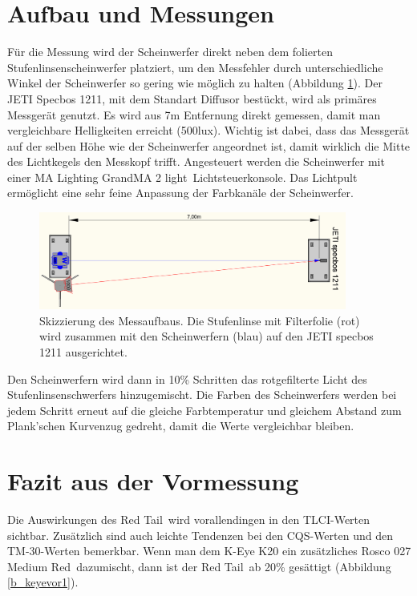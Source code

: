 \section{Aufbau und Messungen}
\label{sec_vmaum}

Für die Messung wird der Scheinwerfer direkt neben dem folierten Stufenlinsenscheinwerfer platziert, um den Messfehler durch unterschiedliche Winkel der Scheinwerfer so gering wie möglich zu halten (Abbildung \ref{b_aufbaumessung1}). Der JETI Specbos 1211, mit dem Standart Diffusor bestückt, wird als primäres Messgerät genutzt. Es wird aus 7m Entfernung direkt gemessen, damit man vergleichbare Helligkeiten erreicht (500lux). Wichtig ist dabei, dass das Messgerät auf der selben Höhe wie der Scheinwerfer angeordnet ist, damit wirklich die Mitte des Lichtkegels den Messkopf trifft.
Angesteuert werden die Scheinwerfer mit einer MA Lighting \glqq GrandMA 2 light\grqq\ Lichtsteuerkonsole. Das Lichtpult ermöglicht eine sehr feine Anpassung der Farbkanäle der Scheinwerfer.

\begin{figure}[H]     %
\centering
\includegraphics[width=0.9\textwidth]{bilder/aufbaumessung1} 
\caption {Skizzierung des Messaufbaus. Die Stufenlinse mit Filterfolie (rot) wird zusammen mit den Scheinwerfern (blau) auf den JETI specbos 1211 ausgerichtet.}\label{b_aufbaumessung1}
\end{figure}



Den Scheinwerfern wird dann in 10\% Schritten das rotgefilterte Licht des Stufenlinsenschwerfers hinzugemischt. Die Farben des Scheinwerfers werden bei jedem Schritt erneut auf die gleiche Farbtemperatur und gleichem Abstand zum Plank'schen Kurvenzug gedreht, damit die Werte vergleichbar bleiben.


\section{Fazit aus der Vormessung}
\label{sec_vmfazit}
Die Auswirkungen des \glqq Red Tail\grqq\ wird vorallendingen in den TLCI-Werten sichtbar. Zusätzlich sind auch leichte Tendenzen bei den CQS-Werten und den TM-30-Werten bemerkbar.
Wenn man dem K-Eye K20 ein zusätzliches Rosco 027 \glqq Medium Red\grqq\ dazumischt, dann ist der \glqq Red Tail\grqq\ ab 20\% gesättigt (Abbildung \ref{b_keyevor1}). 

